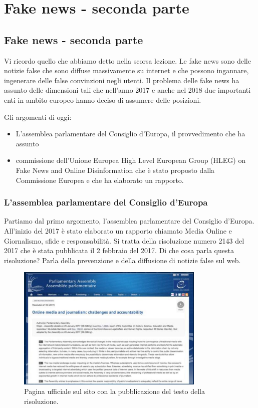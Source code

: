 \chapter{Fake news - seconda parte}

\section{Fake news - seconda parte}

Vi ricordo quello che abbiamo detto nella scorsa lezione. Le fake news sono delle notizie false che sono diffuse massivamente su internet e che possono ingannare, ingenerare delle false convinzioni negli utenti. Il problema delle fake news ha assunto delle dimensioni tali che nell'anno 2017 e anche nel 2018 due importanti enti in ambito europeo hanno deciso di assumere delle posizioni. 

Gli argomenti di oggi:

\begin{itemize}
    \item L'assemblea parlamentare del Consiglio d'Europa, il provvedimento che ha assunto
    \item commissione dell'Unione Europea High Level European Group (HLEG) on Fake News and Online Disinformation che è stato proposto dalla Commissione Europea e che ha elaborato un rapporto.
\end{itemize}

\subsection{L'assemblea parlamentare del Consiglio d'Europa}
Partiamo dal primo argomento, l'assemblea parlamentare del Consiglio d'Europa.
All'inizio del 2017 è stato elaborato un rapporto chiamato Media Online e Giornalismo, sfide e responsabilità. Si tratta della risoluzione numero 2143 del 2017 che è stata pubblicata il 2 febbraio del 2017. 
Di che cosa parla questa risoluzione? 
Parla della prevenzione e della diffusione di notizie false sul web. 

\begin{figure}[h]
\centering
\includegraphics[width=0.8\textwidth]{images/11_lez_fig_01.jpg}
\caption{Pagina ufficiale sul sito con la pubblicazione del testo della risoluzione.}
\label{fig:11_lez_fig_01}
\end{figure}


